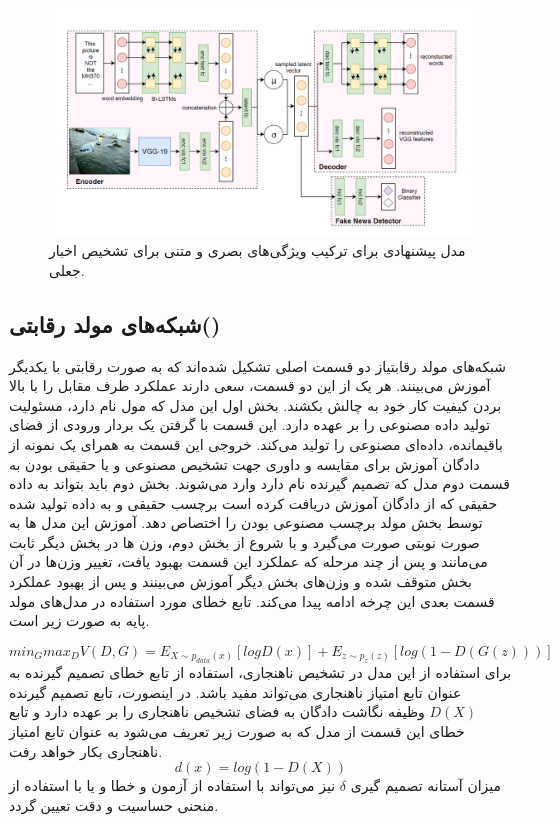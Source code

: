 \documentclass[12pt,a4paper]{report}
\theoremstyle{definition}
\theoremstyle{definition}
\begin{document}
\begin{figure}[!h]
	\begin{center}
		\includegraphics[width=1\linewidth]{./images/figures/khattar.png}
	\end{center}
	\caption{مدل پیشنهادی برای ترکیب ویژگی‌های بصری و متنی برای تشخیص اخبار جعلی\cite{10.1145/3308558.3313552}.}
	\label{fig:khattar}
	\centering
\end{figure}

\subsection{شبکه‌های مولد رقابتی()}
شبکه‌های مولد رقابتیاز دو قسمت اصلی تشکیل شده‌اند که به صورت رقابتی با یکدیگر آموزش می‌بینند. هر یک از این دو قسمت، سعی دارند عملکرد طرف مقابل را با بالا بردن کیفیت کار خود به چالش بکشند. بخش اول این مدل که مول نام دارد، مسئولیت تولید داده مصنوعی را بر عهده دارد. این قسمت با گرفتن یک بردار ورودی از فضای باقیمانده، داده‌ای مصنوعی را تولید می‌کند. خروجی این قسمت به همرای یک نمونه از دادگان آموزش برای مقایسه و داوری جهت تشخیص مصنوعی و یا حقیقی بودن به قسمت دوم مدل که تصمیم گیرنده نام دارد وارد می‌شوند. بخش دوم باید بتواند به داده حقیقی که از دادگان آموزش دریافت کرده است برچسب حقیقی و به داده تولید شده توسط بخش مولد برچسب مصنوعی بودن را اختصاص دهد. آموزش این مدل ها به صورت نوبتی صورت می‌گیرد و با شروع از بخش دوم، وزن ها در بخش دیگر ثابت می‌مانند و پس از چند مرحله که عملکرد این قسمت بهبود یافت، تغییر وزن‌ها در آن بخش متوقف شده و وزن‌های بخش دیگر آموزش می‌بینند و پس از بهبود عملکرد قسمت بعدی این چرخه ادامه پیدا می‌کند. تابع خطای مورد استفاده در مدل‌های مولد پایه به صورت زیر است.

\begin{equation}
	min_G max_D V(D, G) = E_{X \sim p_{data}(x)}[logD(x)] + E_{z \sim p_z(z)}[log(1-D(G(z)))]
\end{equation}
برای استفاده از این مدل در تشخیص ناهنجاری‌، استفاده از تابع خطای تصمیم گیرنده به عنوان تابع امتیاز ناهنجاری می‌تواند مفید باشد. در اینصورت، تابع تصمیم گیرنده $D(X)$ وظیفه نگاشت دادگان به فضای تشخیص ناهنجاری را بر عهده دارد و تابع خطای این قسمت از مدل که به صورت زیر تعریف می‌شود به عنوان تابع امتیاز ناهنجاری بکار خواهد رفت.
\begin{equation}
d(x) = log(1- D(X))
\end{equation}
 میزان آستانه تصمیم گیری $\delta$ نیز می‌تواند با استفاده از آزمون و خطا و یا با استفاده از منحنی حساسیت و دقت تعیین گردد.\\
\end{document}
